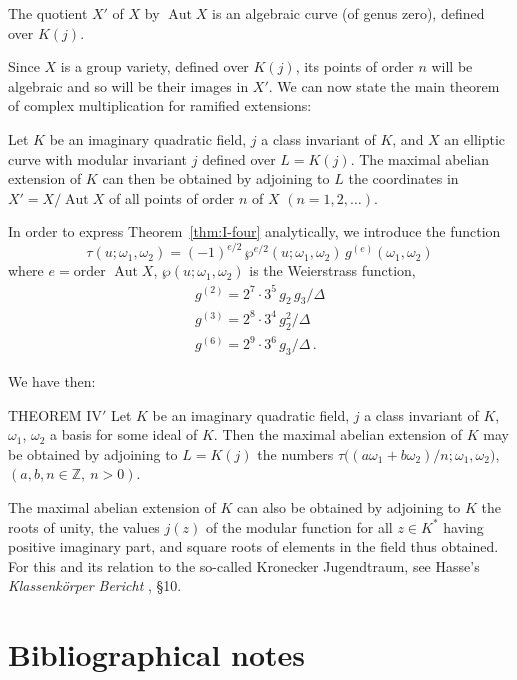 The quotient $X'$ of $X$ by $\operatorname{Aut} X$ is an algebraic curve
(of genus zero), defined over $K(j)$.

Since $X$ is a group variety, defined over $K(j)$, its points of order
$n$ will be algebraic and so will be their images in $X'$. We can now
state the main theorem of complex multiplication for ramified extensions:

\begin{theorem}\label{thm:I-four}
Let $K$ be an imaginary quadratic field, $j$ a class invariant of $K$,
and $X$ an elliptic curve with modular invariant $j$ defined over
$L=K(j)$. The maximal abelian extension of $K$ can then be obtained by
adjoining to $L$ the coordinates in $X'=X/\operatorname{Aut}X$ of all
points of order $n$ of $X$ $(n=1,2,\ldots)$.
\end{theorem}

In order to express Theorem~\ref{thm:I-four} analytically, we introduce
the function
\[
\tau(u;\omega_{1},\omega_{2})
=(-1)^{e/2}\,\wp^{e/2}(u;\omega_{1},\omega_{2})\,
g^{(e)}(\omega_{1},\omega_{2})
\]
where $e=\text{order }\operatorname{Aut}X$, $\wp(u;\omega_{1},\omega_{2})$
is the Weierstrass function,
\[
\begin{gathered}
g^{(2)}=2^{7}\cdot 3^{5}\,g_{2}\,g_{3}/\Delta\\
g^{(3)}=2^{8}\cdot 3^{4}\,g_{2}^{2}/\Delta\\
g^{(6)}=2^{9}\cdot 3^{6}\,g_{3}/\Delta\,.
\end{gathered}
\]

We have then:
\begin{namedstmt}{THEOREM IV$'$}
Let $K$ be an imaginary quadratic field, $j$ a class invariant of $K$,
$\omega_{1}$, $\omega_{2}$ a basis for some ideal of $K$. Then the maximal
abelian extension of $K$ may be obtained by adjoining to $L=K(j)$ the
numbers
$\tau\bigl((a\omega_{1}+b\omega_{2})/n;\omega_{1},\omega_{2}\bigr)$,
$(a,b,n\in\mathbb{Z},\ n>0)$.
\end{namedstmt}

The maximal abelian extension of $K$ can also be obtained by adjoining
to $K$ the roots of unity, the values $j(z)$ of the modular function for
all $z\in K^{*}$ having positive imaginary part, and square roots of
elements in the field thus obtained. For this and its relation to the
so-called Kronecker Jugendtraum, see Hasse's \emph{Klassenk\"orper
Bericht}
\cite{hasse1926bericht}, §10.

\section{Bibliographical notes}\label{sec:I-notes}

